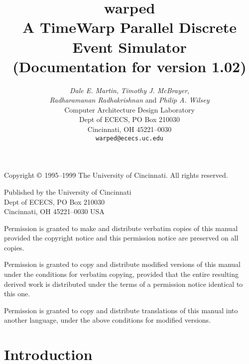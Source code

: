 \documentclass[11pt]{report}
\newcommand{\version}{1.02}
\begin{document}
\title{
\textbf{ {\sc warped} }\\
A TimeWarp Parallel Discrete Event Simulator\\
(Documentation for version \version)}

\author{
\emph{Dale E. Martin}, \emph{Timothy J. McBrayer},\\
\emph{Radharamanan Radhakrishnan} and \emph{Philip A.  Wilsey} \\ 
Computer Architecture Design Laboratory \\
Dept of ECECS, PO Box 210030 \\
Cincinnati, OH  45221--0030 \\
\texttt{warped@ececs.uc.edu}
}

\date{}

\maketitle

\vspace*{6in}

\noindent
Copyright $\copyright$ 1995--1999 The University of Cincinnati.  All
rights reserved.  

\bigskip

\noindent
Published by the University of Cincinnati \\
Dept of ECECS, PO Box 210030 \\
Cincinnati, OH  45221--0030 USA 

\bigskip

\noindent
Permission is granted to make and distribute verbatim copies of
this manual provided the copyright notice and this permission notice
are preserved on all copies.

\medskip
\noindent
Permission is granted to copy and distribute modified versions of this
manual under the conditions for verbatim copying, provided that the entire
resulting derived work is distributed under the terms of a permission
notice identical to this one.

\medskip
\noindent
Permission is granted to copy and distribute translations of this manual
into another language, under the above conditions for modified versions.

\newpage

\tableofcontents

\chapter{Introduction}
\end{document}
